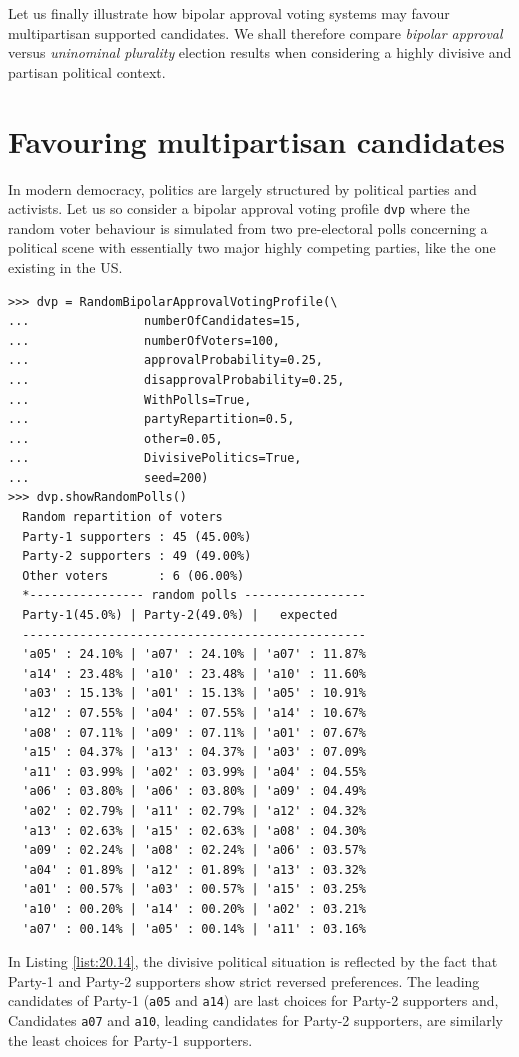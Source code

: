 Let us finally illustrate how bipolar approval voting systems may favour multipartisan supported candidates. We shall therefore compare \emph{bipolar approval} versus \emph{uninominal plurality} election results when considering a highly divisive and partisan political context.
 
\section{Favouring multipartisan candidates}
\label{sec:20.5}

In modern democracy, politics  are largely structured by political parties and activists. Let us so consider a bipolar approval voting profile \texttt{dvp} where the random voter behaviour is simulated from two pre-electoral polls concerning a political scene with essentially two major highly competing parties, like the one existing in the US.
\begin{lstlisting}[caption={A random bipolar approval voting profile in a divisive political context},label=list:20.14]
>>> dvp = RandomBipolarApprovalVotingProfile(\
...                numberOfCandidates=15,
...                numberOfVoters=100,
...                approvalProbability=0.25,
...                disapprovalProbability=0.25,
...                WithPolls=True,
...                partyRepartition=0.5,
...                other=0.05,
...                DivisivePolitics=True,
...                seed=200)
>>> dvp.showRandomPolls()
  Random repartition of voters
  Party-1 supporters : 45 (45.00%)
  Party-2 supporters : 49 (49.00%)
  Other voters       : 6 (06.00%)
  *---------------- random polls -----------------
  Party-1(45.0%) | Party-2(49.0%) |   expected  
  ------------------------------------------------
  'a05' : 24.10% | 'a07' : 24.10% | 'a07' : 11.87%
  'a14' : 23.48% | 'a10' : 23.48% | 'a10' : 11.60%
  'a03' : 15.13% | 'a01' : 15.13% | 'a05' : 10.91%
  'a12' : 07.55% | 'a04' : 07.55% | 'a14' : 10.67%
  'a08' : 07.11% | 'a09' : 07.11% | 'a01' : 07.67%
  'a15' : 04.37% | 'a13' : 04.37% | 'a03' : 07.09%
  'a11' : 03.99% | 'a02' : 03.99% | 'a04' : 04.55%
  'a06' : 03.80% | 'a06' : 03.80% | 'a09' : 04.49%
  'a02' : 02.79% | 'a11' : 02.79% | 'a12' : 04.32%
  'a13' : 02.63% | 'a15' : 02.63% | 'a08' : 04.30%
  'a09' : 02.24% | 'a08' : 02.24% | 'a06' : 03.57%
  'a04' : 01.89% | 'a12' : 01.89% | 'a13' : 03.32%
  'a01' : 00.57% | 'a03' : 00.57% | 'a15' : 03.25%
  'a10' : 00.20% | 'a14' : 00.20% | 'a02' : 03.21%
  'a07' : 00.14% | 'a05' : 00.14% | 'a11' : 03.16%
\end{lstlisting}   
In Listing \ref{list:20.14}, the divisive political situation is reflected by the fact that Party-1 and Party-2 supporters show strict reversed preferences. The leading candidates of Party-1 (\texttt{a05} and \texttt{a14}) are last choices for Party-2 supporters and, Candidates \texttt{a07} and \texttt{a10}, leading candidates for Party-2 supporters, are similarly the least choices for Party-1 supporters.

